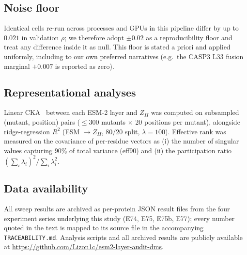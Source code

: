 \documentclass[11pt]{article}
\begin{document}
\subsection{Noise floor}

Identical cells re-run across processes and GPUs in this pipeline differ by up to
$0.021$ in validation $\rho$; we therefore adopt $\pm 0.02$ as a reproducibility floor and
treat any difference inside it as null. This floor is stated a priori and applied uniformly,
including to our own preferred narratives (e.g.\ the CASP3 L33 fusion marginal $+0.007$ is
reported as zero).

\subsection{Representational analyses}

Linear CKA~\cite{kornblith2019} between each ESM-2 layer and $Z_{II}$ was computed on
subsampled (mutant, position) pairs ($\leq 300$ mutants $\times$ 20 positions per mutant),
alongside ridge-regression $R^2$ (ESM $\to Z_{II}$, 80/20 split, $\lambda=100$). Effective
rank was measured on the covariance of per-residue vectors as (i) the number of singular
values capturing 90\% of total variance (eff90) and (ii) the participation ratio
$(\sum_i \lambda_i)^2 / \sum_i \lambda_i^2$.

\subsection*{Data availability}

All sweep results are archived as per-protein JSON result files from the four experiment
series underlying this study (E74, E75, E75b, E77); every number quoted in the text is
mapped to its source file in the accompanying \texttt{TRACEABILITY.md}. Analysis scripts
and all archived results are publicly available at
\url{https://github.com/Lizon1c/esm2-layer-audit-dms}.
\end{document}

